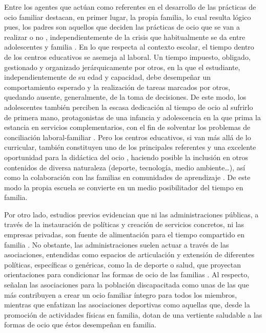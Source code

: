 \documentclass{textolivre}
\begin{document}
Entre los agentes que actúan como referentes en el desarrollo de las prácticas de ocio familiar destacan, en primer lugar, la propia familia, lo cual resulta lógico pues, los padres son aquellos que deciden las prácticas de ocio que se van a realizar o no \cite{buswell2012}, independientemente de la crisis que habitualmente se da entre adolescentes y familia \cite{gomezcobos2008}. En lo que respecta al contexto escolar, el tiempo dentro de los centros educativos se asemeja al laboral. Un tiempo impuesto, obligado, gestionado y organizado jerárquicamente por otros, en la que el estudiante, independientemente de su edad y capacidad, debe desempeñar un comportamiento esperado y la realización de tareas marcados por otros, quedando ausente, generalmente, de la toma de decisiones. De este modo, los adolescentes también perciben la escasa dedicación al tiempo de ocio al sufrirlo de primera mano, protagonistas de una infancia y adolescencia en la que prima la estancia en servicios complementarios, con el fin de solventar los problemas de conciliación laboral-familiar \cite{martinezpampliega2019, varela2016}. Pero los centros educativos, si van más allá de lo curricular, también constituyen uno de los principales referentes y una excelente oportunidad para la didáctica del ocio \cite{gairin2004}, haciendo posible la inclusión en otros contenidos de diversa naturaleza (deporte, tecnología, medio ambiente…), así como la colaboración con las familias en comunidades de aprendizaje \cite{parra2020}. De este modo la propia escuela se convierte en un medio posibilitador del tiempo en familia.

Por otro lado, estudios previos evidencian que ni las administraciones públicas, a través de la instauración de políticas y creación de servicios concretos, ni las empresas privadas, son fuente de alimentación para el tiempo compartido en familia \cite{mchale2014}. No obstante, las administraciones suelen actuar a través de las asociaciones, entendidas como espacios de articulación y extensión de diferentes políticas, específicas o genéricas, como la de deporte o salud, que proyectan orientaciones para condicionar las formas de ocio de las familias \cite{king2015}. Al respecto, \textcite{freeman2003} señalan las asociaciones para la población discapacitada como unas de las que más contribuyen a crear un ocio familiar íntegro para todos los miembros, mientras que \textcite{hernandezprados2019} enfatizan las asociaciones deportivas como aquellas que, desde la promoción de actividades físicas en familia, dotan de una vertiente saludable a las formas de ocio que éstos desempeñan en familia.
\end{document}
